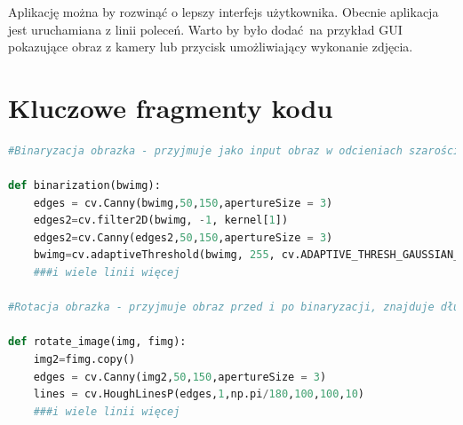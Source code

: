 \documentclass[12pt]{article}
\begin{document}
Aplikację można by rozwinąć o lepszy interfejs użytkownika. Obecnie aplikacja jest uruchamiana z linii poleceń. Warto by było dodać na przykład GUI pokazujące obraz z kamery lub przycisk umożliwiający wykonanie zdjęcia.

\clearpage
\section{Kluczowe fragmenty kodu}
\begin{lstlisting}[language=Python]
#Binaryzacja obrazka - przyjmuje jako input obraz w odcieniach szarości, zwraca obraz czarno biały z uwypuklonymi ciemniejszymi niż tło obszarami. Opiera się na kompletnym zaciemnieniu obszarów, wokół których kolor nigdy się nie zmienia i standardowej binaryzacji dla pozostałych obszarów obrazka

def binarization(bwimg):
	edges = cv.Canny(bwimg,50,150,apertureSize = 3)
	edges2=cv.filter2D(bwimg, -1, kernel[1])
	edges2=cv.Canny(edges2,50,150,apertureSize = 3)
	bwimg=cv.adaptiveThreshold(bwimg, 255, cv.ADAPTIVE_THRESH_GAUSSIAN_C, cv.THRESH_BINARY, Hypers['Binarization_conn'], 1)
	###i wiele linii więcej

#Rotacja obrazka - przyjmuje obraz przed i po binaryzacji, znajduje długie linie na oryginalnym obrazku po czym w zależności od tego, jaki jest w przybliżeniu do 1.8 stopni najczęściej występujący kąt linii, obraca obrazek tak, aby linie znajdujące się pod tym kątem leżały poziomo do obrazka

def rotate_image(img, fimg):
	img2=fimg.copy()
	edges = cv.Canny(img2,50,150,apertureSize = 3)
	lines = cv.HoughLinesP(edges,1,np.pi/180,100,100,10)
	###i wiele linii więcej
	


\end{lstlisting}

\clearpage
\end{document}
